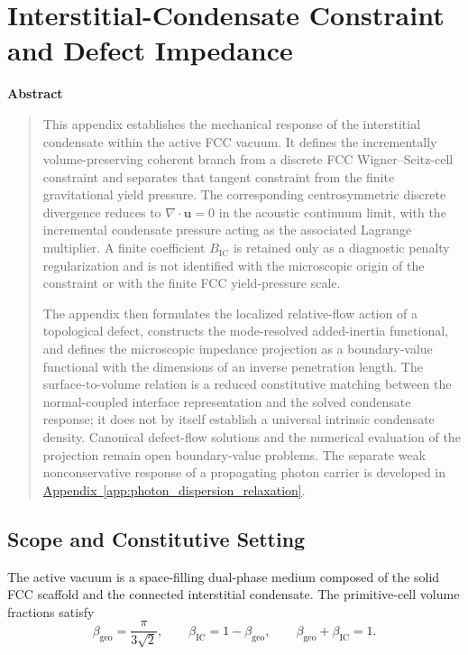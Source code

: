 \chapter[FCC Condensate Constraint and Defect Impedance]{Interstitial-Condensate Constraint and Defect Impedance}
\label{app:condensate_impedance}

\vspace{1em}
\begin{center}
    \textbf{Abstract}
\end{center}
\begin{quote}
\noindent This appendix establishes the mechanical response of the interstitial condensate within the active FCC vacuum. It defines the incrementally volume-preserving coherent branch from a discrete FCC Wigner--Seitz-cell constraint and separates that tangent constraint from the finite gravitational yield pressure. The corresponding centrosymmetric discrete divergence reduces to $\nabla\cdot\mathbf{u}=0$ in the acoustic continuum limit, with the incremental condensate pressure acting as the associated Lagrange multiplier. A finite coefficient $B_{\mathrm{IC}}$ is retained only as a diagnostic penalty regularization and is not identified with the microscopic origin of the constraint or with the finite FCC yield-pressure scale.

The appendix then formulates the localized relative-flow action of a topological defect, constructs the mode-resolved added-inertia functional, and defines the microscopic impedance projection as a boundary-value functional with the dimensions of an inverse penetration length. The surface-to-volume relation is a reduced constitutive matching between the normal-coupled interface representation and the solved condensate response; it does not by itself establish a universal intrinsic condensate density. Canonical defect-flow solutions and the numerical evaluation of the projection remain open boundary-value problems. The separate weak nonconservative response of a propagating photon carrier is developed in \hyperref[app:photon_dispersion_relaxation]{Appendix~\ref*{app:photon_dispersion_relaxation}}.
\end{quote}
\vspace{2em}


\section{Scope and Constitutive Setting}

The active vacuum is a space-filling dual-phase medium composed of the solid FCC scaffold and the connected interstitial condensate. The primitive-cell volume fractions satisfy
\begin{equation}
    \beta_{\mathrm{geo}} = \frac{\pi}{3\sqrt{2}}, \qquad
    \beta_{\mathrm{IC}} = 1-\beta_{\mathrm{geo}}, \qquad
    \beta_{\mathrm{geo}} + \beta_{\mathrm{IC}} = 1.
\end{equation}

